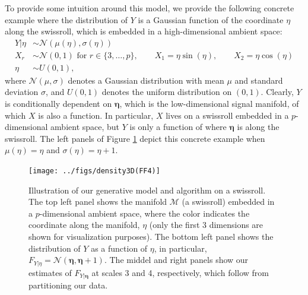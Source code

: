 \documentclass{article} %
\providecommand{\mb}[1]{\boldsymbol{#1}}
\providecommand{\mc}[1]{\mathcal{#1}}
\begin{document}
To provide some intuition around this model, we provide the following concrete example where the distribution of $Y$ is a Gaussian function of the coordinate $\eta$ along the swissroll, which is embedded in a high-dimensional ambient space:
\begin{subequations} \label{eq:linear}
\begin{align}
	Y | \eta &\sim \mc{N}(\mu(\eta) ,\sigma(\eta)) \\
X_r &\sim \mc{N}(0,1) \text{ for } r \in \{3, \ldots, p\}, \qquad 	X_1 = \eta \sin (\eta), \qquad X_2 = \eta \cos (\eta) \\
	\eta  &\sim U(0,1), 
\end{align}
\end{subequations}
where $\mc{N}(\mu,\sigma)$ denotes a Gaussian distribution with mean $\mu$ and standard deviation $\sigma$, and $U(0,1)$ denotes the uniform distribution on $(0,1)$.
Clearly, $Y$ is conditionally dependent on $\mb{\eta}$, which is the low-dimensional signal manifold, of which $X$ is also a function.  In particular, $X$ lives on a swissroll embedded in a $p$-dimensional ambient space, but $Y$ is only a function of where $\mb{\eta}$ is along the swissroll. The left panels of Figure \ref{fig:swiss} depict this concrete example when $\mu(\eta)=\eta$ and $\sigma(\eta)=\eta + 1$.


\begin{figure}[htbp]
	\centering
		\texttt{[image: ../figs/density3D(FF4)]}
	\caption{Illustration of our generative model and algorithm on a swissroll. The top left panel shows the manifold $\mc{M}$ (a swissroll) embedded in a $p$-dimensional ambient space, where the color indicates the coordinate along the manifold, $\eta$ (only the first 3 dimensions are shown for visualization purposes). The bottom left panel shows the distribution of $Y$ as a function of $\eta$, in particular, $F_{Y|\eta}=\mc{N}(\mb{\eta},\mb{\eta}+1)$. The middel and right panels show our estimates of $F_{Y|\mb{\eta}}$ at scales 3 and 4, respectively, which follow from partitioning our data.}
	\label{fig:swiss}
\end{figure}
\end{document}
